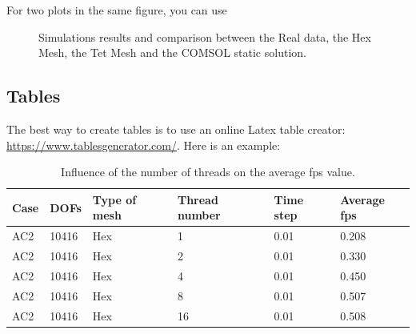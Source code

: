For two plots in the same figure, you can use

\begin{figure}[htb]%
    \centering
    \qquad
    \caption{Simulations results and comparison between the Real data, the Hex Mesh, the Tet Mesh and the COMSOL static solution.}%
    \label{fig:gravity_left}%
\end{figure}

\subsection{Tables}\label{tables}

The best way to create tables is to use an online Latex table creator: \url{https://www.tablesgenerator.com/}. Here is an example:

\begin{table}[htp]
    \centering
    \begin{tabular}{@{}llllll@{}}
    \toprule
    Case & DOFs  & Type of mesh & Thread number & Time step & Average fps  \\ \midrule
    AC2  & 10416 & Hex          & 1             & 0.01      & 0.208 \\
    AC2  & 10416 & Hex          & 2             & 0.01      & 0.330 \\
    AC2  & 10416 & Hex          & 4             & 0.01      & 0.450 \\
    AC2  & 10416 & Hex          & 8             & 0.01      & 0.507 \\
    AC2  & 10416 & Hex          & 16            & 0.01      & 0.508 \\ \bottomrule
    \end{tabular}
    \caption{Influence of the number of threads on the average fps value.}
    \label{tab:thread_number}
\end{table}


